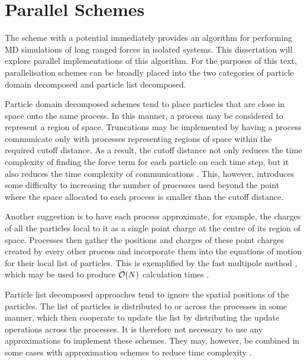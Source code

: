 \section{Parallel Schemes}
\label{sec:background:subsec:parallel_schemes}

%
The \velocityverlet{} scheme with a \twobody{} potential
immediately provides an algorithm for
performing MD simulations of long ranged forces in isolated systems.
%
This dissertation will explore parallel implementations of this algorithm.
%
For the purposes of this text,
parallelisation schemes can be broadly placed into the two categories
of particle domain decomposed and particle list decomposed.

Particle domain decomposed schemes tend to place particles that are
close in space onto the same process.
%
In this manner, a process may be considered to represent a region of space.
%
Truncations may be implemented by having a process communicate
only with processes representing regions of space within the required
cutoff distance.
%
As a result, the cutoff distance not only reduces the time complexity
of finding the force term for each particle on each time step,
but it also reduces the time complexity of communications
\cite{plimpton1995fast}.
%
This, however, introduces some difficulty to increasing the number
of processes used beyond the point where the space allocated to
each process is smaller than the cutoff distance.

Another suggestion is to have each process approximate, for example,
the charges of all the particles local to it as a single point charge
at the centre of its region of space.
%
Processes then gather the positions and charges of these point charges
created by every other process and incorporate them into the equations
of motion for their local list of particles.
%
This is exemplified by the fast multipole method
\cite{appel1985efficient},
which may be used to produce $\mathcal{O}{\left({ N }\right)}$
calculation times \cite{esselink1992order}.


Particle list decomposed approaches tend to ignore the spatial positions
of the particles.
%
The list of particles is distributed to or across the processes in some manner,
which then cooperate to update the list by distributing the update
operations across the processes.
%
It is therefore not necessary to use any approximations to
implement these schemes.
%
They may, however, be combined in some cases with
approximation schemes to reduce time complexity
\cite{smith1994parallel}.

